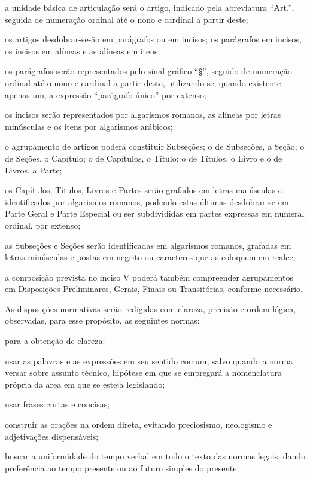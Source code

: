 \documentclass[calibri]{brlex2}
\begin{document}
\inc a unidade básica de articulação será o artigo, indicado pela abreviatura ``Art.'', seguida de numeração ordinal até o nono e cardinal a partir deste;

\inc os artigos desdobrar-se-ão em parágrafos ou em incisos; os parágrafos em incisos, os incisos em alíneas e as alíneas em itens;

\inc os parágrafos serão representados pelo sinal gráfico ``§'', seguido de numeração ordinal até o nono e cardinal a partir deste, utilizando-se, quando existente apenas um, a expressão ``parágrafo único'' por extenso;

\inc os incisos serão representados por algarismos romanos, as alíneas por letras minúsculas e os itens por algarismos arábicos;

\inc o agrupamento de artigos poderá constituir Subseções; o de Subseções, a Seção; o de Seções, o Capítulo; o de Capítulos, o Título; o de Títulos, o Livro e o de Livros, a Parte;

\inc os Capítulos, Títulos, Livros e Partes serão grafados em letras maiúsculas e identificados por algarismos romanos, podendo estas últimas desdobrar-se em Parte Geral e Parte Especial ou ser subdivididas em partes expressas em numeral ordinal, por extenso;

\inc as Subseções e Seções serão identificadas em algarismos romanos, grafadas em letras minúsculas e postas em negrito ou caracteres que as coloquem em realce;

\inc a composição prevista no inciso V poderá também compreender agrupamentos em Disposições Preliminares, Gerais, Finais ou Transitórias, conforme necessário.

\art As disposições normativas serão redigidas com clareza, precisão e ordem lógica, observadas, para esse propósito, as seguintes normas:

\inc para a obtenção de clareza:

\alinea usar as palavras e as expressões em seu sentido comum, salvo quando a norma versar sobre assunto técnico, hipótese em que se empregará a nomenclatura própria da área em que se esteja legislando;

\alinea usar frases curtas e concisas;

\alinea construir as orações na ordem direta, evitando preciosismo, neologismo e adjetivações dispensáveis;

\alinea buscar a uniformidade do tempo verbal em todo o texto das normas legais, dando preferência ao tempo presente ou ao futuro simples do presente;
\end{document}
